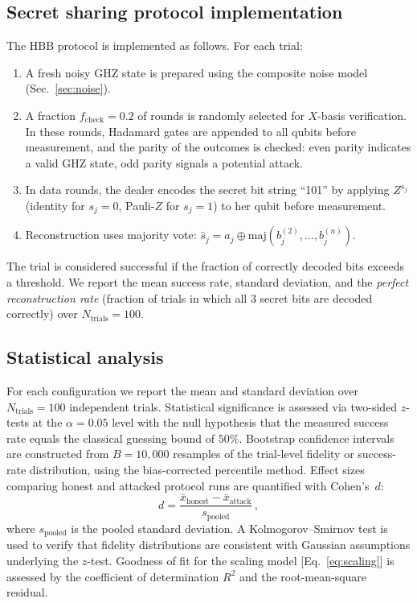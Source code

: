 \documentclass[aip, amsmath, amssymb, preprint, longbibliography]{revtex4-2}
\begin{document}
\subsection{Secret sharing protocol implementation}\label{sec:protocol_impl}

The HBB protocol is implemented as follows. For each trial:
\begin{enumerate}
\item A fresh noisy GHZ state is prepared using the composite noise
      model (Sec.~\ref{sec:noise}).
\item A fraction $f_{\text{check}}=0.2$ of rounds is randomly selected
      for $X$-basis verification. In these rounds, Hadamard gates are
      appended to all qubits before measurement, and the parity of the
      outcomes is checked: even parity indicates a valid GHZ state, odd
      parity signals a potential attack.
\item In data rounds, the dealer encodes the secret bit string ``101''
      by applying $Z^{s_j}$ (identity for $s_j=0$, Pauli-$Z$ for
      $s_j=1$) to her qubit before measurement.
\item Reconstruction uses majority vote:
      $\hat{s}_j = a_j \oplus \text{maj}(b_j^{(2)},\ldots,b_j^{(n)})$.
\end{enumerate}
The trial is considered successful if the fraction of correctly
decoded bits exceeds a threshold. We report the mean success rate,
standard deviation, and the \emph{perfect reconstruction rate} (fraction
of trials in which all 3 secret bits are decoded correctly) over
$N_{\text{trials}}=100$.

\subsection{Statistical analysis}\label{sec:stat_methods}

For each configuration we report the mean and standard deviation over
$N_{\text{trials}}=100$ independent trials. Statistical significance is
assessed via two-sided $z$-tests at the $\alpha=0.05$ level with the
null hypothesis that the measured success rate equals the classical
guessing bound of $50\%$. Bootstrap confidence intervals are constructed
from $B=10{,}000$ resamples of the trial-level fidelity or success-rate
distribution, using the bias-corrected percentile
method. Effect sizes comparing honest and
attacked protocol runs are quantified with Cohen's~$d$:
\begin{equation}
d = \frac{\bar{x}_{\text{honest}}-\bar{x}_{\text{attack}}}
         {s_{\text{pooled}}}\,,
\label{eq:cohens_d}
\end{equation}
where $s_{\text{pooled}}$ is the pooled standard deviation. A
Kolmogorov--Smirnov test is used to verify that fidelity distributions
are consistent with Gaussian assumptions underlying the $z$-test.
Goodness of fit for the scaling model [Eq.~\eqref{eq:scaling}] is
assessed by the coefficient of determination $R^2$ and the root-mean-square
residual.
\end{document}
